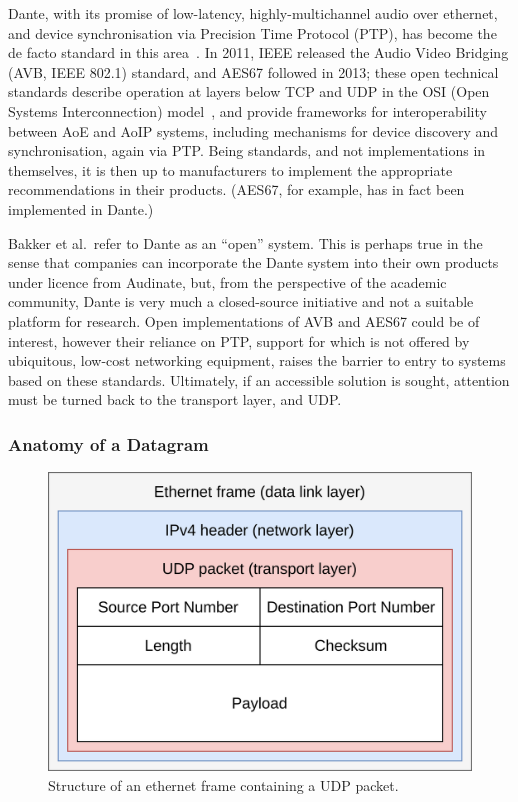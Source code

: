 Dante, with its promise of low-latency, highly-multichannel audio over ethernet,
and device synchronisation via Precision Time Protocol (PTP), has become the de
facto standard in this area~\citep{bakker_introduction_2014}.
In 2011, IEEE released the Audio Video Bridging (AVB, IEEE 802.1) standard,
and AES67 followed in 2013; these open technical standards describe operation
at layers below TCP and UDP in the OSI (Open Systems Interconnection)
model~\citep{}, and provide frameworks for
interoperability between AoE and AoIP systems, including mechanisms for device
discovery and synchronisation, again via PTP\@.
Being standards, and not implementations in themselves, it is then up to
manufacturers to implement the appropriate recommendations in their products.
(AES67, for example, has in fact been implemented in Dante.)

Bakker et al.\ refer to Dante as an ``open'' system.
This is perhaps true in the sense that companies can incorporate the Dante
system into their own products under licence from Audinate, but, from the
perspective of the academic community, Dante is very much a closed-source
initiative and not a suitable platform for research.
Open implementations of AVB and AES67 could be of interest, however their
reliance on PTP, support for which is not offered by ubiquitous, low-cost
networking equipment, raises the barrier to entry to systems based on these
standards.
Ultimately, if an accessible solution is sought, attention must be turned back
to the transport layer, and UDP\@.


\subsubsection{Anatomy of a Datagram}\label{subsubsec:anatomy-of-a-datagram}

\begin{figure}[h]
    \centering
    \includegraphics[width=.5\textwidth]{figures/udp}
    \caption{Structure of an ethernet frame containing a UDP packet.}
    \label{fig:udp-frame}
\end{figure}

